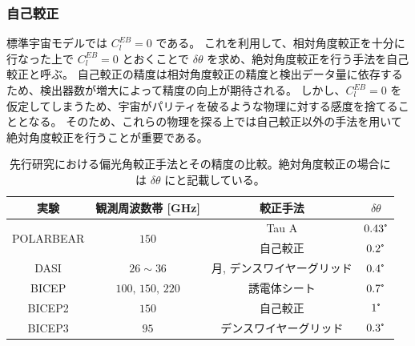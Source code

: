 \documentclass[../../main.tex]{subfiles}
\begin{document}
\subsubsection{自己較正}
標準宇宙モデルでは $C_{l}^{EB}=0$ である。
これを利用して、相対角度較正を十分に行なった上で $C_{l}^{EB} = 0$ とおくことで
$\delta\theta$ を求め、絶対角度較正を行う手法を自己較正と呼ぶ。
自己較正の精度は相対角度較正の精度と検出データ量に依存するため、検出器数が増大によって精度の向上が期待される。
しかし、$C_{l}^{EB}=0$ を仮定してしまうため、宇宙がパリティを破るような物理に対する感度を捨てることとなる。
そのため、これらの物理を探る上では自己較正以外の手法を用いて絶対角度較正を行うことが重要である。

\begin{table}[H]
    \centering
    \caption{先行研究における偏光角較正手法とその精度の比較。絶対角度較正の場合には $\delta\theta$ にと記載している。}
    \begin{tabular}{cccc}
        実験 & 観測周波数帯 [GHz] & 較正手法 & $\delta\theta$ \\
        \hline
        \hline
        \multirow{2}{*}{POLARBEAR\cite{so:polarbear_cal}} & \multirow{2}{*}{$150$} & Tau A & $0.43\tcdegree$ \\
                                                          &                        & 自己較正 & $0.2\tcdegree$ \\
        DASI\cite{so:Leitch_2002} & $26\sim36$ & 月, デンスワイヤーグリッド & $0.4\tcdegree$ \\
        BICEP\cite{so:Takahashi_2008} & $100,\,150,\,220$ & 誘電体シート & $0.7\tcdegree$ \\
        BICEP2\cite{so:bicep2_syserr} & $150$ & 自己較正 & $1\tcdegree$ \\
        BICEP3\cite{so:bicep3} & $95$ & デンスワイヤーグリッド & $0.3\tcdegree$ 
    \end{tabular}
    \label{tab:so-polarization_calibration}
\end{table}
\end{document}
